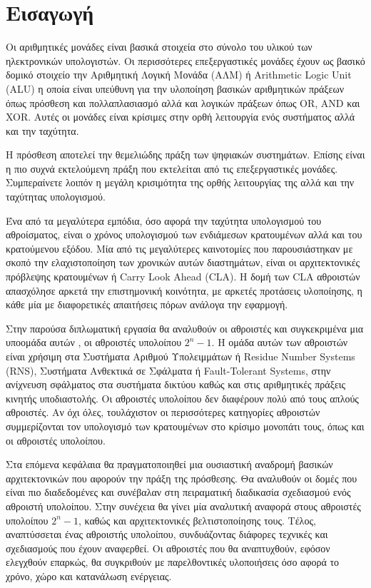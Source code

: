 
\section{Εισαγωγή}

Οι αριθμητικές μονάδες είναι βασικά στοιχεία στο σύνολο του υλικού των ηλεκτρονικών υπολογιστών. Οι περισσότερες επεξεργαστικές μονάδες έχουν ως βασικό δομικό στοιχείο την Αριθμητική Λογική Μονάδα (ΑΛΜ) ή Arithmetic Logic Unit (ALU) η οποία είναι υπεύθυνη για την υλοποίηση βασικών αριθμητικών πράξεων όπως πρόσθεση και πολλαπλασιασμό αλλά και λογικών πράξεων όπως OR, AND και XOR. Αυτές οι μονάδες είναι κρίσιμες στην ορθή λειτουργία ενός συστήματος αλλά και την ταχύτητα.

Η πρόσθεση αποτελεί την θεμελιώδης πράξη των ψηφιακών συστημάτων. Επίσης είναι η πιο συχνά εκτελούμενη πράξη που εκτελείται από τις επεξεργαστικές μονάδες. Συμπεραίνετε λοιπόν η μεγάλη κρισιμότητα της ορθής λειτουργίας της αλλά και την ταχύτητας υπολογισμού. 

Ένα από τα μεγαλύτερα εμπόδια, όσο αφορά την ταχύτητα υπολογισμού του αθροίσματος, είναι ο χρόνος υπολογισμού των ενδιάμεσων κρατουμένων αλλά και του κρατούμενου εξόδου. Μία από τις μεγαλύτερες καινοτομίες που παρουσιάστηκαν με σκοπό την ελαχιστοποίηση των χρονικών αυτών διαστημάτων, είναι οι αρχιτεκτονικές πρόβλεψης κρατουμένων ή Carry Look Ahead (CLA). Η δομή των CLA αθροιστών απασχόλησε αρκετά την επιστημονική κοινότητα, με αρκετές προτάσεις υλοποίησης, η κάθε μία με διαφορετικές απαιτήσεις πόρων ανάλογα την εφαρμογή.


Στην παρούσα διπλωματική εργασία θα αναλυθούν οι αθροιστές και συγκεκριμένα μια υποομάδα αυτών , οι αθροιστές υπολοίπου $2^n-1$. Η ομάδα αυτών των αθροιστών είναι χρήσιμη στα Συστήματα Αριθμού Υπολειμμάτων ή Residue Number Systems (RNS), Συστήματα Ανθεκτικά σε Σφάλματα ή Fault-Tolerant Systems, στην ανίχνευση σφάλματος στα συστήματα δικτύου καθώς και στις αριθμητικές πράξεις κινητής υποδιαστολής. Οι αθροιστές υπολοίπου δεν διαφέρουν πολύ από τους απλούς αθροιστές. Αν όχι όλες, τουλάχιστον οι περισσότερες κατηγορίες αθροιστών συμμερίζονται τον υπολογισμό των κρατουμένων στο κρίσιμο μονοπάτι τους, όπως και οι αθροιστές υπολοίπου.

Στα επόμενα κεφάλαια θα πραγματοποιηθεί μια ουσιαστική αναδρομή βασικών αρχιτεκτονικών 
που αφορούν την πράξη της πρόσθεσης. Θα αναλυθούν οι δομές που είναι πιο διαδεδομένες και
συνέβαλαν στη πειραματική διαδικασία σχεδιασμού ενός αθροιστή υπολοίπου. Στην συνέχεια 
θα γίνει μία αναλυτική αναφορά στους αθροιστές υπολοίπου $2^n-1$, καθώς και αρχιτεκτονικές
βελτιστοποίησης τους. Τέλος, αναπτύσσεται ένας αθροιστής υπολοίπου, συνδυάζοντας διάφορες 
τεχνικές και σχεδιασμούς που έχουν αναφερθεί. Οι αθροιστές που θα αναπτυχθούν, εφόσον ελεγχθούν επαρκώς, θα συγκριθούν με παρελθοντικές υλοποιήσεις όσο αφορά το χρόνο, χώρο και κατανάλωση ενέργειας.

